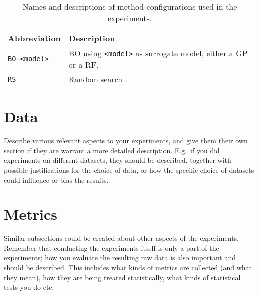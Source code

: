 \begin{table}[H]
\centering
\caption[Names and descriptions of method configurations.]{Names and descriptions of method configurations used in the experiments.}
\begin{tabular}{ll}
\toprule
\textbf{Abbreviation} & \textbf{Description} \\
\midrule
\texttt{BO-<model>} & \Acrshort{BO} using \texttt{<model>} as surrogate model, either a \acrshort{GP} or a \acrshort{RF}. \\
\texttt{RS} & Random search \citep{bergstra2012random}.  \\
\bottomrule
\end{tabular}
\label{tab:methods}
\end{table}

\section{Data}\label{sec:data}

Describe various relevant aspects to your experiments, and give them their own section if they are warrant a more detailed description.
E.g.\ if you did experiments on different datasets, they should be described, together with possible justifications for the choice of data, or how the specific choice of datasets could influence or bias the results.

\section{Metrics}\label{sec:metrics}

Similar subsections could be created about other aspects of the experiments.
Remember that conducting the experiments itself is only a part of the experiments; how you evaluate the resulting raw data is also important and should be described.
This includes what kinds of metrics are collected (and what they mean), how they are being treated statistically, what kinds of statistical tests you do etc.
